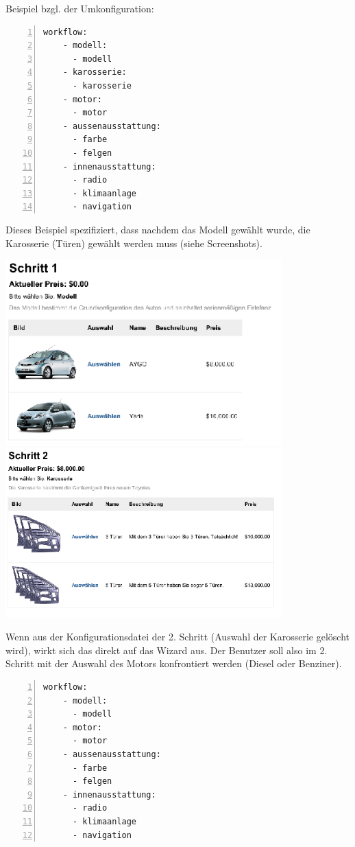 \documentclass[a4paper,10pt]{article}
\begin{document}
Beispiel bzgl. der Umkonfiguration:

\begin{lstlisting}[numbers=left]
  workflow:
    - modell: 
      - modell 
    - karosserie: 
      - karosserie
    - motor:
      - motor
    - aussenausstattung: 
      - farbe 
      - felgen
    - innenausstattung: 
      - radio 
      - klimaanlage
      - navigation
\end{lstlisting}

Dieses Beispiel spezifiziert, dass nachdem das Modell gewählt wurde, die Karosserie (Türen) gewählt werden muss (siehe Screenshots).

\includegraphics[width=0.8\textwidth]{screenshots/sequence1.png}
\\
\includegraphics[width=0.8\textwidth]{screenshots/sequence2.png}

Wenn aus der Konfigurationsdatei der 2. Schritt (Auswahl der Karosserie gelöscht wird), wirkt sich das direkt auf das Wizard aus.
Der Benutzer soll also im 2. Schritt mit der Auswahl des Motors konfrontiert werden (Diesel oder Benziner).

\begin{lstlisting}[numbers=left]
  workflow:
    - modell: 
      - modell 
    - motor:
      - motor
    - aussenausstattung: 
      - farbe 
      - felgen
    - innenausstattung: 
      - radio 
      - klimaanlage
      - navigation
\end{lstlisting}
\end{document}
